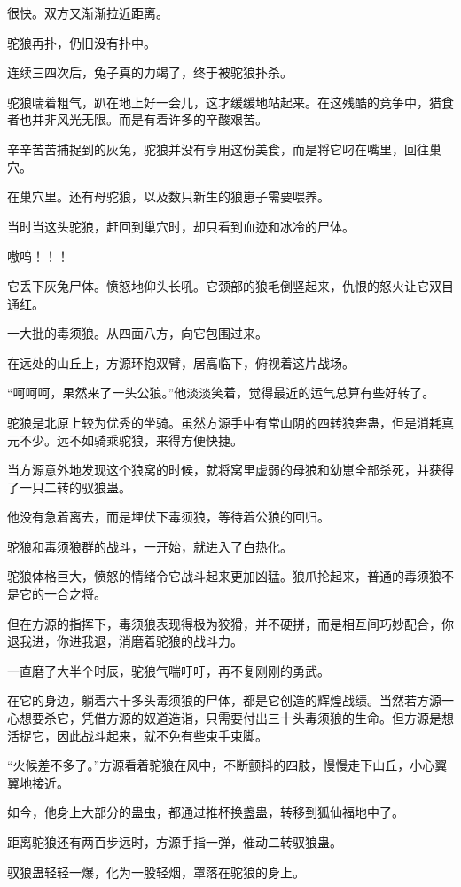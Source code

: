 \begin{this_body}
很快。双方又渐渐拉近距离。

驼狼再扑，仍旧没有扑中。

连续三四次后，兔子真的力竭了，终于被驼狼扑杀。

驼狼喘着粗气，趴在地上好一会儿，这才缓缓地站起来。在这残酷的竞争中，猎食者也并非风光无限。而是有着许多的辛酸艰苦。

辛辛苦苦捕捉到的灰兔，驼狼并没有享用这份美食，而是将它叼在嘴里，回往巢穴。

在巢穴里。还有母驼狼，以及数只新生的狼崽子需要喂养。

当时当这头驼狼，赶回到巢穴时，却只看到血迹和冰冷的尸体。

嗷呜！！！

它丢下灰兔尸体。愤怒地仰头长吼。它颈部的狼毛倒竖起来，仇恨的怒火让它双目通红。

一大批的毒须狼。从四面八方，向它包围过来。

在远处的山丘上，方源环抱双臂，居高临下，俯视着这片战场。

“呵呵呵，果然来了一头公狼。”他淡淡笑着，觉得最近的运气总算有些好转了。

驼狼是北原上较为优秀的坐骑。虽然方源手中有常山阴的四转狼奔蛊，但是消耗真元不少。远不如骑乘驼狼，来得方便快捷。

当方源意外地发现这个狼窝的时候，就将窝里虚弱的母狼和幼崽全部杀死，并获得了一只二转的驭狼蛊。

他没有急着离去，而是埋伏下毒须狼，等待着公狼的回归。

驼狼和毒须狼群的战斗，一开始，就进入了白热化。

驼狼体格巨大，愤怒的情绪令它战斗起来更加凶猛。狼爪抡起来，普通的毒须狼不是它的一合之将。

但在方源的指挥下，毒须狼表现得极为狡猾，并不硬拼，而是相互间巧妙配合，你退我进，你进我退，消磨着驼狼的战斗力。

一直磨了大半个时辰，驼狼气喘吁吁，再不复刚刚的勇武。

在它的身边，躺着六十多头毒须狼的尸体，都是它创造的辉煌战绩。当然若方源一心想要杀它，凭借方源的奴道造诣，只需要付出三十头毒须狼的生命。但方源是想活捉它，因此战斗起来，就不免有些束手束脚。

“火候差不多了。”方源看着驼狼在风中，不断颤抖的四肢，慢慢走下山丘，小心翼翼地接近。

如今，他身上大部分的蛊虫，都通过推杯换盏蛊，转移到狐仙福地中了。

距离驼狼还有两百步远时，方源手指一弹，催动二转驭狼蛊。

驭狼蛊轻轻一爆，化为一股轻烟，罩落在驼狼的身上。


\end{this_body}
